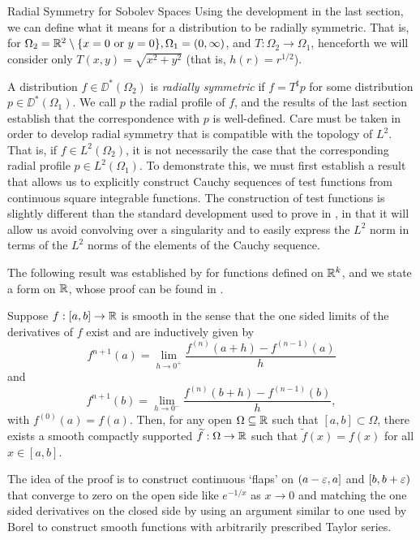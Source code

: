 \begin{chapter}{Radial Symmetry for Sobolev Spaces}
Using the development in the last section, we can define what it means for a distribution to be radially symmetric. 
That is, for $\Omega_2 = \mathbb R^2\setminus \{x =0\text{ or }y=0\},\Omega_1 = (0,\infty)$, and $T:\Omega_2 \to \Omega_1$, henceforth we will consider only $T(x,y) = \sqrt{x^2 + y^2}$ (that is, $h(r) = r^{1/2}$). 

A distribution $f \in \DD^*(\Omega_2)$ is \emph{radially symmetric} if $f = T^\sharp p$ for some distribution $p \in \DD^*(\Omega_1)$.
We call $p$ the radial profile of $f$, and the results of the last section establish that the correspondence with $p$ is well-defined.
Care must be taken in order to develop radial symmetry that is compatible with the topology of $L^2$.
That is, if $f \in L^2(\Omega_2)$, it is not necessarily the case that the corresponding radial profile $p \in L^2(\Omega_1)$.
To demonstrate this, we must first establish a result that allows us to explicitly construct Cauchy sequences of test functions from continuous square integrable functions.
The construction of test functions is slightly different than the standard development used to prove  in \citep{hormander1983,richtmyer1978principles}, in that it will allow us avoid convolving over a singularity and to easily express the $L^2$ norm in terms of the $L^2$ norms of the elements of the Cauchy sequence.

The following result was established by \citep{seeley1964extension} for functions defined on $\mathbb R^k$, and we state a form on $\mathbb R$, whose proof can be found in \citep{strichartz2000}.
\begin{thm} \label{thm:extension}
  Suppose $f:[a,b]\to \mathbb R$ is smooth in the sense that the one sided limits of the derivatives of $f$ exist and are inductively  given by
  \begin{equation}
    f^{n+1}(a) = \lim_{h\to 0^+} \frac{f^{(n)}(a+h) - f^{(n-1)}(a)}{h} 
  \end{equation}
  and 
  \begin{equation}
    f^{n+1}(b) = \lim_{h\to 0^-} \frac{f^{(n)}(b+h) - f^{(n-1)}(b)}{h}, 
  \end{equation}
  with $f^{(0)}(a) = f(a)$.
  Then, for any open $\Omega \subseteq \mathbb R$ such that $[a,b] \subset \Omega$, there exists a smooth compactly supported $\widetilde f:\Omega \to \mathbb R$ such that $\tilde f(x) = f(x)$ for all $x\in [a,b]$.
\end{thm}
The idea of the proof is to construct continuous `flaps' on $(a-\varepsilon,a]$ and $[b,b+\varepsilon)$ that converge to zero on the open side like $e^{-1/x}$ as $x\to 0$ and matching the one sided derivatives on the closed side by using an argument similar to one used by Borel to construct smooth functions with arbitrarily prescribed Taylor series.


\end{chapter}
